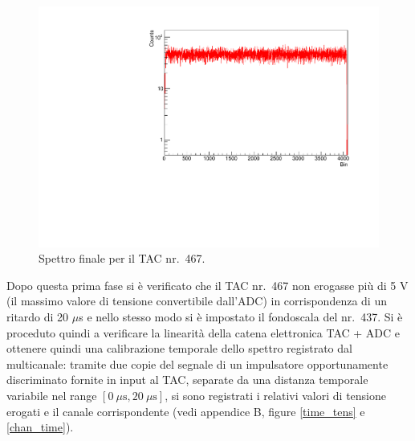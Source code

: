 \documentclass[10pt, oneside, a4paper]{article}   	%
\begin{document}
%
\begin{figure}[]
	\centering
	\includegraphics[scale=0.45]{img/bkg_dx2.pdf}
	\caption{Spettro finale per il TAC nr.~467.}
	\label{rumore2}
\end{figure}
%
Dopo questa prima fase si è verificato che il TAC nr.~467 non erogasse più di 5 V (il massimo valore di tensione convertibile dall'ADC) in corrispondenza di un ritardo di 20 $\mu$s e nello stesso modo si è impostato il fondoscala del nr.~437. Si è proceduto quindi a verificare la linearità della catena elettronica TAC + ADC e ottenere quindi una calibrazione temporale dello spettro registrato dal multicanale: tramite due copie del segnale di un impulsatore opportunamente discriminato fornite in input al TAC, separate da una distanza temporale variabile nel range $[0 \ \mu \mbox{s},20 \ \mu \mbox{s}]$, si sono registrati i relativi valori di tensione erogati e il canale corrispondente (vedi appendice B, figure \ref{time_tens} e \ref{chan_time}).
%
%
%
%
\end{document}
